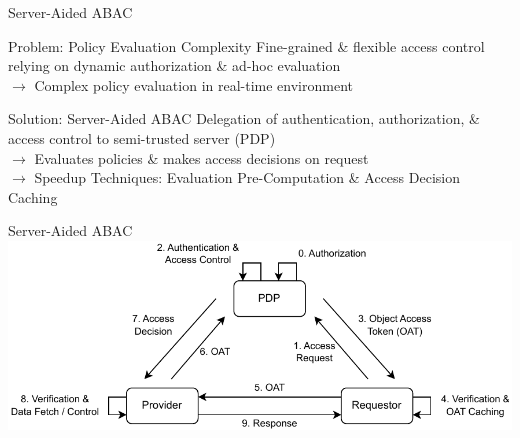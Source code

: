 \documentclass[en]{sdqbeamer}
\begin{document}
\begin{frame}{Server-Aided ABAC}
    \begin{redblock}{Problem: Policy Evaluation Complexity}
        Fine-grained \& flexible access control relying on dynamic authorization \& ad-hoc evaluation
        \\$\rightarrow$ Complex policy evaluation in real-time environment
    \end{redblock}

    \begin{greenblock}{Solution: Server-Aided ABAC}
        Delegation of authentication, authorization, \& access control to semi-trusted server (PDP)
        \\$\rightarrow$ Evaluates policies \& makes access decisions on request
        \\$\rightarrow$ Speedup Techniques: Evaluation Pre-Computation \& Access Decision Caching
    \end{greenblock}
\end{frame}

\begin{frame}{Server-Aided ABAC}
    \centering
    \includegraphics[width=1.0\textwidth]{./figures/access_control_request_delegation.drawio.pdf}
\end{frame}
\end{document}
